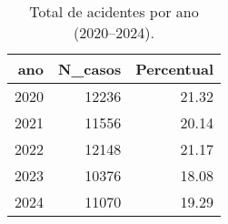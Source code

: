 \begin{table}
\caption{Total de acidentes por ano (2020–2024).}
\begin{tabular}{rrr}
\toprule
ano & N_casos & Percentual \\
\midrule
2020 & 12236 & 21.32 \\
2021 & 11556 & 20.14 \\
2022 & 12148 & 21.17 \\
2023 & 10376 & 18.08 \\
2024 & 11070 & 19.29 \\
\bottomrule
\end{tabular}
\end{table}
